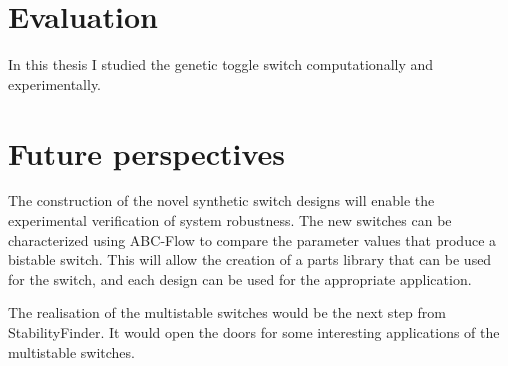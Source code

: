 \section{Evaluation}


In this thesis I studied the genetic toggle switch computationally and experimentally. 





\section{Future perspectives}

The construction of the novel synthetic switch designs will enable the experimental verification of system robustness. The new switches can be characterized using ABC-Flow to compare the parameter values that produce a bistable switch. This will allow the creation of a parts library that can be used for the switch, and each design can be used for the appropriate application.

The realisation of the multistable switches would be the next step from StabilityFinder. It would open the doors for some interesting applications of the multistable switches.

